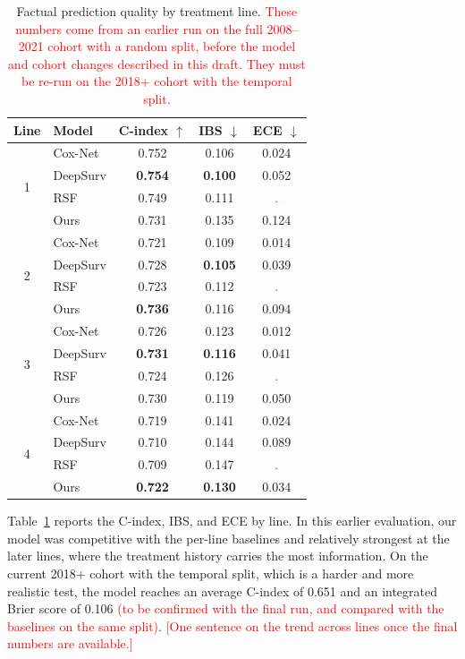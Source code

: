 \documentclass[a4paper,10pt]{article}
\newcommand{\todo}[1]{\textcolor{red}{#1}}
\begin{document}
\begin{table}[h]
\centering
\begin{tabular}{clccc}
\toprule
\textbf{Line} & \textbf{Model} & \textbf{C-index $\uparrow$} & \textbf{IBS $\downarrow$} & \textbf{ECE $\downarrow$} \\
\midrule
\multirow{4}{*}{1}
 & Cox-Net                 & 0.752 & 0.106 & 0.024 \\
 & DeepSurv                & \textbf{0.754} & \textbf{0.100} & 0.052 \\
 & RSF                     & 0.749 & 0.111 & \todo{.} \\
 & Ours                    & 0.731 & 0.135 & 0.124 \\
\midrule
\multirow{4}{*}{2}
 & Cox-Net                 & 0.721 & 0.109 & 0.014 \\
 & DeepSurv                & 0.728 & \textbf{0.105} & 0.039 \\
 & RSF                     & 0.723 & 0.112 & \todo{.} \\
 & Ours                    & \textbf{0.736} & 0.116 & 0.094 \\
\midrule
\multirow{4}{*}{3}
 & Cox-Net                 & 0.726 & 0.123 & 0.012 \\
 & DeepSurv                & \textbf{0.731} & \textbf{0.116} & 0.041 \\
 & RSF                     & 0.724 & 0.126 & \todo{.} \\
 & Ours                    & 0.730 & 0.119 & 0.050 \\
\midrule
\multirow{4}{*}{4}
 & Cox-Net                 & 0.719 & 0.141 & 0.024 \\
 & DeepSurv                & 0.710 & 0.144 & 0.089 \\
 & RSF                     & 0.709 & 0.147 & \todo{.} \\
 & Ours                    & \textbf{0.722} & \textbf{0.130} & 0.034 \\
\bottomrule
\end{tabular}
\caption{Factual prediction quality by treatment line. \todo{These numbers come from an earlier run on the full 2008--2021 cohort with a random split, before the model and cohort changes described in this draft. They must be re-run on the 2018+ cohort with the temporal split.}}
\label{tab:factual-perline}
\end{table}

Table~\ref{tab:factual-perline} reports the C-index, IBS, and ECE by line. In this earlier evaluation, our model was competitive with the per-line baselines and relatively strongest at the later lines, where the treatment history carries the most information. On the current 2018+ cohort with the temporal split, which is a harder and more realistic test, the model reaches an average C-index of 0.651 and an integrated Brier score of 0.106 \todo{(to be confirmed with the final run, and compared with the baselines on the same split)}. \todo{[One sentence on the trend across lines once the final numbers are available.]}
\end{document}
